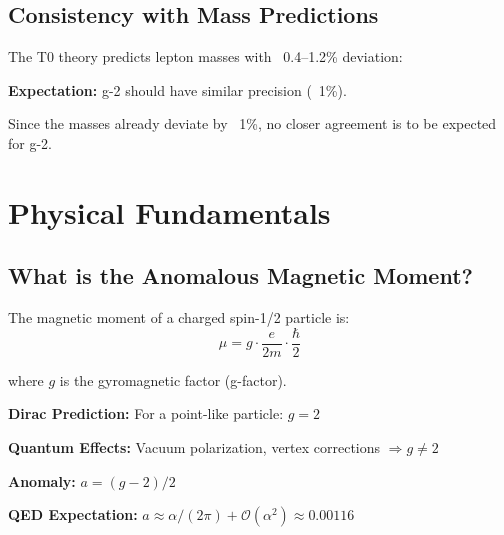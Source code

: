 	\subsection{Consistency with Mass Predictions}
	
	The T0 theory predicts lepton masses with ~0.4--1.2\% deviation:
	
	\begin{table}[h]
		\centering
		\caption{Lepton masses in T0}
	\end{table}
	
	\textbf{Expectation:} g-2 should have similar precision (~1\%).
	
	Since the masses already deviate by ~1\%, no closer agreement is to be expected for g-2.
	
	\section{Physical Fundamentals}
	
	\subsection{What is the Anomalous Magnetic Moment?}
	
	The magnetic moment of a charged spin-1/2 particle is:
	\begin{equation}
		\mu = g \cdot \frac{e}{2m} \cdot \frac{\hbar}{2}
	\end{equation}
	
	where $g$ is the gyromagnetic factor (g-factor).
	
	\textbf{Dirac Prediction:} For a point-like particle: $g = 2$
	
	\textbf{Quantum Effects:} Vacuum polarization, vertex corrections $\Rightarrow g \neq 2$
	
	\textbf{Anomaly:} $a = (g-2)/2$
	
	\textbf{QED Expectation:} $a \approx \alpha/(2\pi) + \mathcal{O}(\alpha^2) \approx 0.00116$
	
